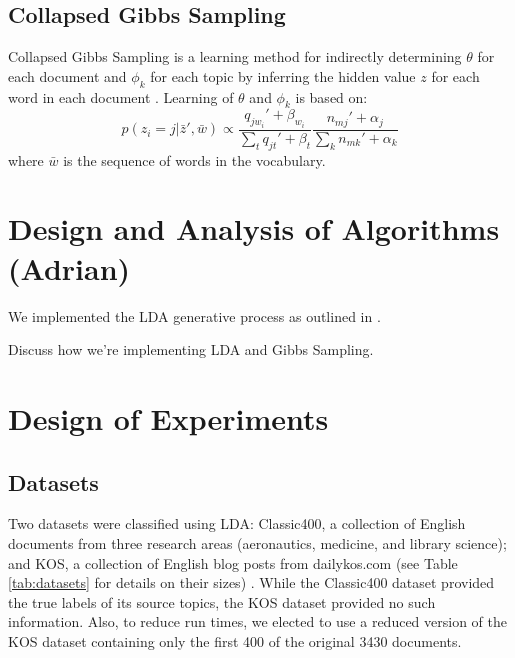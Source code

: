 \documentclass[10pt]{article}
\begin{document}
\subsection{Collapsed Gibbs Sampling}
\label{sec:gibbs}
Collapsed Gibbs Sampling is a learning method for indirectly determining $\theta$ for each document and $\phi_k$ for each topic by inferring the hidden value $z$ for each word in each document \cite{CSE250B}. Learning of $\theta$ and $\phi_k$ is based on:
\begin{equation}
    p(z_i = j | \bar{z}', \bar{w}) \propto \frac{q_{j w_i}' + \beta_{w_i}}{\sum_t q_{jt}' + \beta_t} \frac{n_{mj}' + \alpha_j}{\sum_k n_{mk}' + \alpha_k}
\end{equation}
where $\bar{w}$ is the sequence of words in the vocabulary.



\section{Design and Analysis of Algorithms (Adrian)}
\label{sec:algorithms}

We implemented the LDA generative process as outlined in \cite{CSE250B}.

Discuss how we're implementing LDA and Gibbs Sampling.



\section{Design of Experiments}
\label{sec:experiments}

%
%
\subsection{Datasets}
Two datasets were classified using LDA: Classic400, a collection of English documents from three research areas (aeronautics, medicine, and library science); and KOS, a collection of English blog posts from dailykos.com (see Table \ref{tab:datasets} for details on their sizes) \cite{Classic400, KOS_dataset}. While the Classic400 dataset provided the true labels of its source topics, the KOS dataset provided no such information. Also, to reduce run times, we elected to use a reduced version of the KOS dataset containing only the first 400 of the original 3430 documents.
\end{document}
